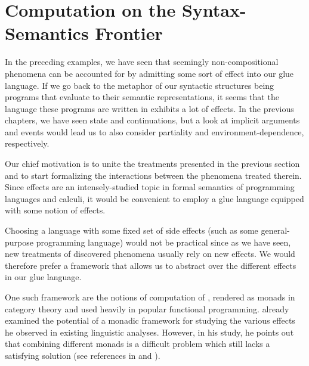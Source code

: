 \documentclass{article}
\begin{document}



\section{Computation on the Syntax-Semantics Frontier}

In the preceding examples, we have seen that seemingly non-compositional
phenomena can be accounted for by admitting some sort of effect into our glue
language. If we go back to the metaphor of our syntactic structures being
programs that evaluate to their semantic representations, it seems that the
language these programs are written in exhibits a lot of effects. In the
previous chapters, we have seen state and continuations, but a look at
implicit arguments and events would lead us to also consider partiality and
environment-dependence, respectively.

Our chief motivation is to unite the treatments presented in the previous
section and to start formalizing the interactions between the phenomena
treated therein. Since effects are an intensely-studied topic in formal
semantics of programming languages and calculi, it would be convenient to
employ a glue language equipped with some notion of effects.

Choosing a language with some fixed set of side effects (such as some
general-purpose programming language) would not be practical since as we have
seen, new treatments of discovered phenomena usually rely on new effects. We
would therefore prefer a framework that allows us to abstract over the
different effects in our glue language.

One such framework are the notions of computation of
\citet{moggi1991notions}, rendered as monads in category theory and used
heavily in popular functional programming. \citet{shan2002monads} already
examined the potential of a monadic framework for studying the various effects
he observed in existing linguistic analyses. However, in his study, he points
out that combining different monads is a difficult problem which still lacks a
satisfying solution (see references in \cite{shan2002monads} and
\citet{kammar2013handlers}).
\end{document}
